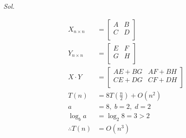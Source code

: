 
\textit{ Sol. }

\begin{align*}
	X_{n \times n}  & = \begin{bmatrix}
		                    A & B \\
		                    C & D \\
	                    \end{bmatrix}                      \\
	Y_{n \times n}  & = \begin{bmatrix}
		                    E & F \\
		                    G & H \\
	                    \end{bmatrix}                      \\
	X \cdot Y       & = \begin{bmatrix}
		                    AE + BG & AF + BH \\
		                    CE + DG & CF + DH \\
	                    \end{bmatrix}                   \\
	T(n)            & = 8T\left(\frac{n}{2}\right) + O(n^2) \\
	a               & = 8, \; b = 2, \; d = 2               \\
	\log_b a        & = \log_2 8 = 3 > 2                    \\
	\therefore T(n) & = O(n^3)
\end{align*}


